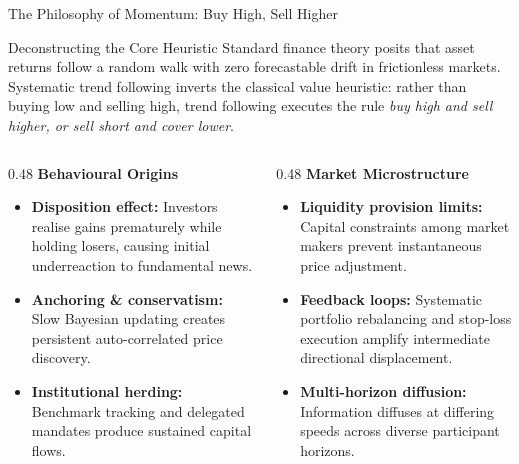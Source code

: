 \documentclass[10pt]{beamer}
\begin{document}
\begin{frame}{The Philosophy of Momentum: Buy High, Sell Higher}
  \begin{block}{Deconstructing the Core Heuristic}
    Standard finance theory posits that asset returns follow a random walk with zero forecastable drift in frictionless markets. Systematic trend following inverts the classical value heuristic: rather than buying low and selling high, trend following executes the rule \emph{buy high and sell higher, or sell short and cover lower}.
  \end{block}
  \vspace{0.1cm}
  \begin{columns}[t]
    \begin{column}{0.48\textwidth}
      \textbf{\scriptsize Behavioural Origins}
      \begin{itemize}\scriptsize
        \item \textbf{Disposition effect:} Investors realise gains prematurely while holding losers, causing initial underreaction to fundamental news.
        \item \textbf{Anchoring \& conservatism:} Slow Bayesian updating creates persistent auto-correlated price discovery.
        \item \textbf{Institutional herding:} Benchmark tracking and delegated mandates produce sustained capital flows.
      \end{itemize}
    \end{column}
    \begin{column}{0.48\textwidth}
      \textbf{\scriptsize Market Microstructure}
      \begin{itemize}\scriptsize
        \item \textbf{Liquidity provision limits:} Capital constraints among market makers prevent instantaneous price adjustment.
        \item \textbf{Feedback loops:} Systematic portfolio rebalancing and stop-loss execution amplify intermediate directional displacement.
        \item \textbf{Multi-horizon diffusion:} Information diffuses at differing speeds across diverse participant horizons.
      \end{itemize}
    \end{column}
  \end{columns}
\end{frame}
\end{document}
